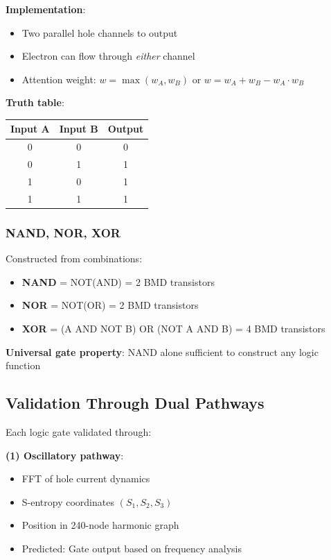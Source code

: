 \documentclass[11pt,a4paper]{article}
\begin{document}
\textbf{Implementation}:
\begin{itemize}
\item Two parallel hole channels to output
\item Electron can flow through \textit{either} channel
\item Attention weight: $w = \max(w_A, w_B)$ or $w = w_A + w_B - w_A \cdot w_B$
\end{itemize}

\textbf{Truth table}:
\begin{center}
\begin{tabular}{cc|c}
Input A & Input B & Output \\
\hline
0 & 0 & 0 \\
0 & 1 & 1 \\
1 & 0 & 1 \\
1 & 1 & 1 \\
\end{tabular}
\end{center}

\subsubsection{NAND, NOR, XOR}

Constructed from combinations:
\begin{itemize}
\item \textbf{NAND} = NOT(AND) = 2 BMD transistors
\item \textbf{NOR} = NOT(OR) = 2 BMD transistors  
\item \textbf{XOR} = (A AND NOT B) OR (NOT A AND B) = 4 BMD transistors
\end{itemize}

\textbf{Universal gate property}: NAND alone sufficient to construct any logic function

\subsection{Validation Through Dual Pathways}

Each logic gate validated through:

\textbf{(1) Oscillatory pathway}:
\begin{itemize}
\item FFT of hole current dynamics
\item S-entropy coordinates $(S_1, S_2, S_3)$
\item Position in 240-node harmonic graph
\item Predicted: Gate output based on frequency analysis
\end{itemize}
\end{document}
